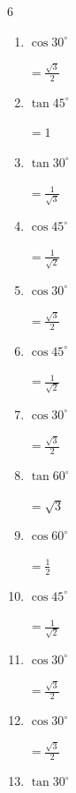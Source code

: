 \begin{multicols}{6}
\begin{enumerate}
        $\displaystyle =\frac{1}{\sqrt{2}}$

  \item $\displaystyle \cos{30^\circ}$

        $\displaystyle =\frac{\sqrt{3}}{2}$

  \item $\displaystyle \tan{45^\circ}$

        $\displaystyle =1$

\columnbreak %

  \item $\displaystyle \tan{30^\circ}$

        $\displaystyle =\frac{1}{\sqrt{3}}$

  \item $\displaystyle \cos{45^\circ}$

        $\displaystyle =\frac{1}{\sqrt{2}}$

  \item $\displaystyle \cos{30^\circ}$

        $\displaystyle =\frac{\sqrt{3}}{2}$

  \item $\displaystyle \cos{45^\circ}$

        $\displaystyle =\frac{1}{\sqrt{2}}$

  \item $\displaystyle \cos{30^\circ}$

        $\displaystyle =\frac{\sqrt{3}}{2}$

  \item $\displaystyle \tan{60^\circ}$

        $\displaystyle =\sqrt{3}$

  \item $\displaystyle \cos{60^\circ}$

        $\displaystyle =\frac{1}{2}$

  \item $\displaystyle \cos{45^\circ}$

        $\displaystyle =\frac{1}{\sqrt{2}}$

  \item $\displaystyle \cos{30^\circ}$

        $\displaystyle =\frac{\sqrt{3}}{2}$

  \item $\displaystyle \cos{30^\circ}$

        $\displaystyle =\frac{\sqrt{3}}{2}$

  \item $\displaystyle \tan{30^\circ}$


\end{enumerate}
\end{multicols}
